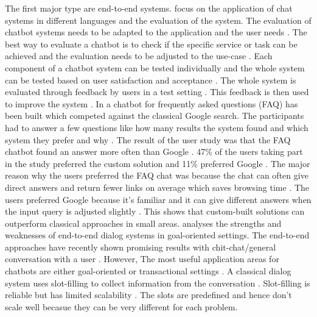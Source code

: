The first major type are end-to-end systems.
\citet{evaluateChatbotsShawar2007} focus on the application of chat systems in different languages and the evaluation of the system.
The evaluation of chatbot systems needs to be adapted to the application and the user needs \cite{evaluateChatbotsShawar2007}.
The best way to evaluate a chatbot is to check if the specific service or task can be achieved and the evaluation 
needs to be adjusted to the use-case \cite{evaluateChatbotsShawar2007}.
Each component of a chatbot system can be tested individually and the whole system can be tested based on user 
satisfaction and acceptance \cite{evaluateChatbotsShawar2007}.
The whole system is evaluated through feedback by users in a test setting \cite{evaluateChatbotsShawar2007}.
This feedback is then used to improve the system \cite{evaluateChatbotsShawar2007}. 
In \citet{evaluateChatbotsShawar2007} a chatbot for frequently asked questions (FAQ) has been built 
which competed against the classical Google search.
The participants had to answer a few questions like how many results the system found and which system they prefer 
and why \cite{evaluateChatbotsShawar2007}. 
The result of the user study was that the FAQ chatbot found an answer more often than Google \cite{evaluateChatbotsShawar2007}.
47\% of the users taking part in the study preferred the custom solution and 11\% preferred Google \cite{evaluateChatbotsShawar2007}.
The major reason why the users preferred the FAQ chat was because the chat can often give direct answers and return 
fewer links on average which saves browsing time \cite{evaluateChatbotsShawar2007}. 
The users preferred Google because it's familiar and it can give different answers when the input query is adjusted 
slightly \cite{evaluateChatbotsShawar2007}.
This shows that custom-built solutions can outperform classical approaches in small areas.
\citet{bordes2016learning} analyses the strengths and weaknesses of end-to-end dialog systems in goal-oriented settings.
The end-to-end approaches have recently shown promising results with chit-chat/general conversation with a user \cite{bordes2016learning}.
However, The most useful application areas for chatbots are either goal-oriented or transactional settings \cite{bordes2016learning}.
A classical dialog system uses slot-filling to collect information from the conversation \cite{bordes2016learning}.
Slot-filling is reliable but has limited scalability \cite{bordes2016learning}.
The slots are predefined and hence don't scale well becasue they can be very different for each problem. 
